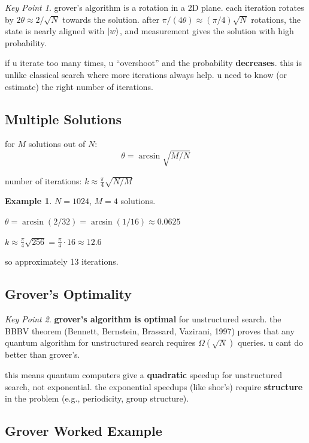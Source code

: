 \documentclass[11pt,a4paper]{article}
\theoremstyle{definition}
\newtheorem{example}{Example}[section]
\theoremstyle{remark}
\newtheorem*{keypoint}{Key Point}
\begin{document}
\begin{keypoint}
grover's algorithm is a rotation in a 2D plane. each iteration rotates by $2\theta \approx 2/\sqrt{N}$ towards the solution. after $\pi/(4\theta) \approx (\pi/4)\sqrt{N}$ rotations, the state is nearly aligned with $\ket{w}$, and measurement gives the solution with high probability.

if u iterate too many times, u ``overshoot'' and the probability \textbf{decreases}. this is unlike classical search where more iterations always help. u need to know (or estimate) the right number of iterations.
\end{keypoint}

\subsection{Multiple Solutions}

for $M$ solutions out of $N$:
\[
\theta = \arcsin\sqrt{M/N}
\]

number of iterations: $k \approx \frac{\pi}{4}\sqrt{N/M}$

\begin{example}
$N = 1024$, $M = 4$ solutions.

$\theta = \arcsin(2/32) = \arcsin(1/16) \approx 0.0625$

$k \approx \frac{\pi}{4}\sqrt{256} = \frac{\pi}{4} \cdot 16 \approx 12.6$

so approximately 13 iterations.
\end{example}

\subsection{Grover's Optimality}

\begin{keypoint}
\textbf{grover's algorithm is optimal} for unstructured search. the BBBV theorem (Bennett, Bernstein, Brassard, Vazirani, 1997) proves that any quantum algorithm for unstructured search requires $\Omega(\sqrt{N})$ queries. u cant do better than grover's.

this means quantum computers give a \textbf{quadratic} speedup for unstructured search, not exponential. the exponential speedups (like shor's) require \textbf{structure} in the problem (e.g., periodicity, group structure).
\end{keypoint}

\subsection{Grover Worked Example}
\end{document}
